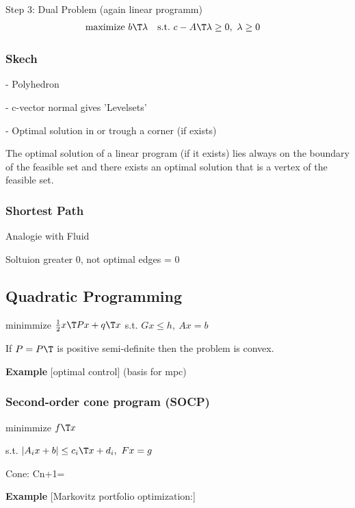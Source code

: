 Step 3: Dual Problem (again linear programm)
\begin{equation}
	\begin{aligned}
		\operatorname{maximize}\  & b\T\lambda & \text{s.t.}\  & c-A\T\lambda \ge 0,\ \lambda\ge0
	\end{aligned}
\end{equation}

\subsubsection{Skech}

- Polyhedron

- c-vector normal gives 'Levelsets'

- Optimal solution in or trough a corner (if exists)

\begin{proposition}
	The optimal solution of a linear program (if it exists)
	lies always on the boundary of the feasible set
	and there exists an optimal solution that is a vertex of the feasible set.
\end{proposition}

\subsubsection{Shortest Path}

Analogie with Fluid

Soltuion greater 0, not optimal edges = 0

\subsection{Quadratic Programming}

minimmize $\frac{1}{2}x\T Px+q\T x$
s.t. $Gx\le h,\ Ax=b$

If $P=P\T$ is positive semi-definite
then the problem is convex.

\textbf{Example} [optimal control] (basis for mpc)

\subsubsection{Second-order cone program (SOCP)}

minimmize $f\T x$

s.t. $|A_ix+b|\le c_i\T x+d_i,\ Fx=g$

Cone: Cn+1= %

\textbf{Example} [Markovitz portfolio optimization:]

